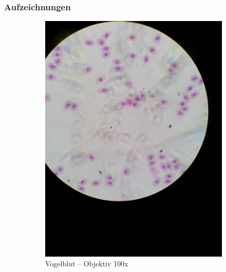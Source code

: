 \subsubsection{Aufzeichnungen}
\begin{figure}[h!]
	\centering
	\begin{subfigure}[b]{0.45\textwidth}
		\includegraphics[angle=270, width=1\textwidth]{../images/02_bird_blood.jpg}
		\caption{Vogelblut -- Objektiv 100x}
	\end{subfigure}
	\begin{subfigure}[b]{0.45\textwidth}

\end{subfigure}
\end{figure}
